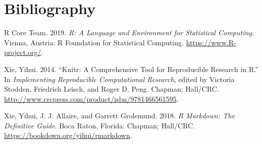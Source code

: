 \documentclass[]{article}
\begin{document}
\hypertarget{sec:bib}{%
\section*{Bibliography}\label{sec:bib}}

\hypertarget{refs}{}
\leavevmode\hypertarget{ref-r_core_team_r:_2019}{}%
R Core Team. 2019. \emph{R: A Language and Environment for Statistical
Computing}. Vienna, Austria: R Foundation for Statistical Computing.
\url{https://www.R-project.org/}.

\leavevmode\hypertarget{ref-stodden_knitr:_2014}{}%
Xie, Yihui. 2014. ``Knitr: A Comprehensive Tool for Reproducible
Research in R.'' In \emph{Implementing Reproducible Computational
Research}, edited by Victoria Stodden, Friedrich Leisch, and Roger D.
Peng. Chapman; Hall/CRC.
\url{http://www.crcpress.com/product/isbn/9781466561595}.

\leavevmode\hypertarget{ref-xie_r_2018}{}%
Xie, Yihui, J. J. Allaire, and Garrett Grolemund. 2018. \emph{R
Markdown: The Definitive Guide}. Boca Raton, Florida: Chapman; Hall/CRC.
\url{https://bookdown.org/yihui/rmarkdown}.
\end{document}
